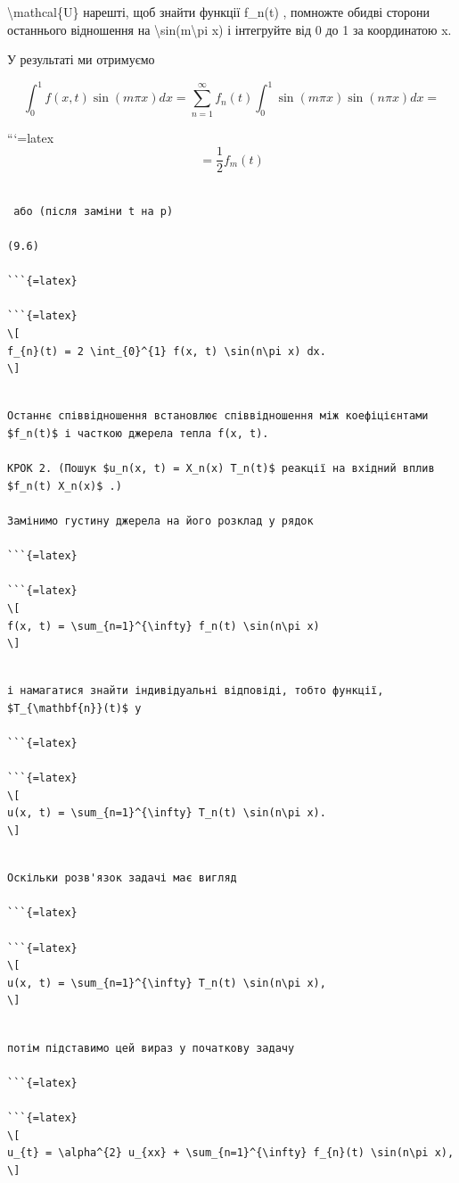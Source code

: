 \documentclass[
]{article}
\begin{document}
\textbackslash mathcal\{U\} нарешті, щоб знайти функції f\_n(t) ,
помножте обидві сторони останнього відношення на
\textbackslash sin(m\textbackslash pi x) і інтегруйте від 0 до 1 за
координатою x.

У результаті ми отримуємо

\[
\int_{0}^{1} f(x, t) \sin(m\pi x) dx = \sum_{n=1}^{\infty} f_{n}(t) \int_{0}^{1} \sin(m\pi x) \sin(n\pi x) dx =
\]

```{=latex}
\[
= \frac{1}{2} f_{m}(t)
\]

\begin{verbatim}

 або (після заміни t на p)

(9.6)

```{=latex}

```{=latex}
\[
f_{n}(t) = 2 \int_{0}^{1} f(x, t) \sin(n\pi x) dx.
\]
\end{verbatim}

\begin{verbatim}

Останнє співвідношення встановлює співвідношення між коефіцієнтами $f_n(t)$ і часткою джерела тепла f(x, t).

КРОК 2. (Пошук $u_n(x, t) = X_n(x) T_n(t)$ реакції на вхідний вплив $f_n(t) X_n(x)$ .)

Замінимо густину джерела на його розклад у рядок

```{=latex}

```{=latex}
\[
f(x, t) = \sum_{n=1}^{\infty} f_n(t) \sin(n\pi x)
\]
\end{verbatim}

\begin{verbatim}

і намагатися знайти індивідуальні відповіді, тобто функції, $T_{\mathbf{n}}(t)$ у

```{=latex}

```{=latex}
\[
u(x, t) = \sum_{n=1}^{\infty} T_n(t) \sin(n\pi x).
\]
\end{verbatim}

\begin{verbatim}

Оскільки розв'язок задачі має вигляд

```{=latex}

```{=latex}
\[
u(x, t) = \sum_{n=1}^{\infty} T_n(t) \sin(n\pi x),
\]
\end{verbatim}

\begin{verbatim}

потім підставимо цей вираз у початкову задачу

```{=latex}

```{=latex}
\[
u_{t} = \alpha^{2} u_{xx} + \sum_{n=1}^{\infty} f_{n}(t) \sin(n\pi x),
\]
\end{verbatim}
\end{document}
